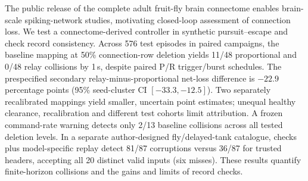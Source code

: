 The public release of the complete adult fruit-fly brain connectome enables brain-scale spiking-network studies, motivating closed-loop assessment of connection loss. We test a connectome-derived controller in synthetic pursuit--escape and check record consistency. Across 576 test episodes in paired campaigns, the baseline mapping at 50\% connection-row deletion yields 11/48 proportional and 0/48 relay collisions by 1\,s, despite paired P/R trigger/burst schedules. The prespecified secondary relay-minus-proportional net-loss difference is $-22.9$ percentage points (95\% seed-cluster CI $[-33.3,-12.5]$). Two separately recalibrated mappings yield smaller, uncertain point estimates; unequal healthy clearance, recalibration and different test cohorts limit attribution. A frozen command-rate warning detects only 2/13 baseline collisions across all tested deletion levels. In a separate author-designed fly/delayed-tank catalogue, checks plus model-specific replay detect 81/87 corruptions versus 36/87 for trusted headers, accepting all 20 distinct valid inputs (six misses). These results quantify finite-horizon collisions and the gains and limits of record checks.
